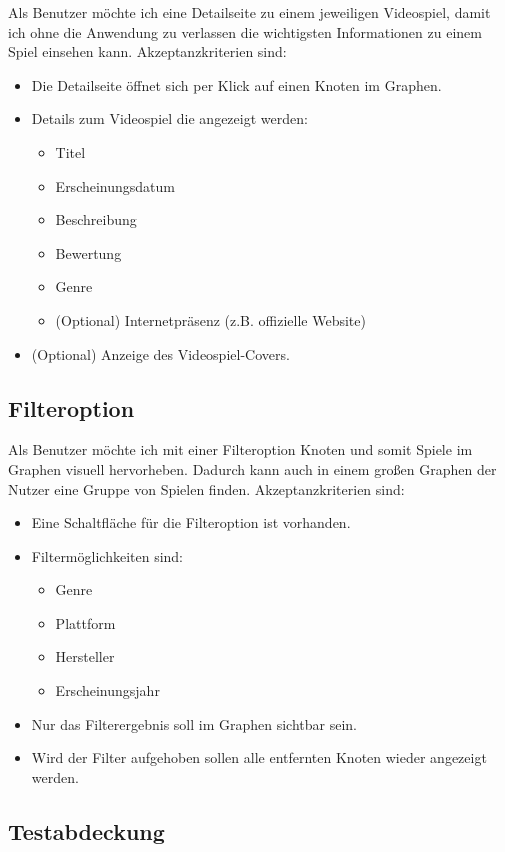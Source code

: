\documentclass[a4paper, 10pt, conference]{IEEEtran}
\begin{document}
Als Benutzer möchte ich eine Detailseite zu einem jeweiligen Videospiel, damit ich ohne die Anwendung zu verlassen die wichtigsten Informationen zu einem Spiel einsehen kann. Akzeptanzkriterien sind:
\begin{itemize}
    \item Die Detailseite öffnet sich per Klick auf einen Knoten im Graphen.
    \item Details zum Videospiel die angezeigt werden:
    \begin{itemize}
    	\item Titel
    	\item Erscheinungsdatum
    	\item Beschreibung
    	\item Bewertung
    	\item Genre
    	\item (Optional) Internetpräsenz (z.B. offizielle Website)
    \end{itemize}
    \item (Optional) Anzeige des Videospiel-Covers.
\end{itemize}


\subsection{Filteroption}\label{subsec:filter}

Als Benutzer möchte ich mit einer Filteroption Knoten und somit Spiele im Graphen visuell hervorheben. Dadurch kann auch in einem großen Graphen der Nutzer eine Gruppe von Spielen finden. Akzeptanzkriterien sind:
\begin{itemize}
	\item Eine Schaltfläche für die Filteroption ist vorhanden.
    \item Filtermöglichkeiten sind: 
    \begin{itemize}
      \item Genre
      \item Plattform
      \item Hersteller
      \item Erscheinungsjahr
    \end{itemize}
    \item Nur das Filterergebnis soll im Graphen sichtbar sein.
    \item Wird der Filter aufgehoben sollen alle entfernten Knoten wieder angezeigt werden.
\end{itemize}


\subsection{Testabdeckung}
\end{document}
